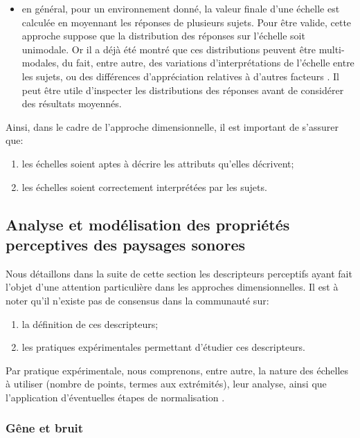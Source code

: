 \begin{itemize}
\item en général, pour un environnement donné, la valeur finale d'une échelle est calculée en moyennant les réponses de plusieurs sujets. Pour être valide, cette approche suppose que la distribution des réponses sur l'échelle soit unimodale. Or il a déjà été montré que ces distributions peuvent être multi-modales, du fait, entre autre, des variations d'interprétations de l'échelle entre les sujets, ou des différences d'appréciation relatives à d'autres facteurs \citep{raimbault2006qualitative}. Il peut être utile d'inspecter les distributions des réponses avant de considérer des résultats moyennés.

\end{itemize}

Ainsi, dans le cadre de l'approche dimensionnelle, il est important de s'assurer que:

\begin{enumerate}
\item les échelles soient aptes à décrire les attributs qu'elles décrivent;
\item les échelles soient correctement interprétées par les sujets.
\end{enumerate}

\subsection{Analyse et modélisation des propriétés perceptives des paysages sonores}
\label{sec:descripteursPercetifs}

Nous détaillons dans la suite de cette section les descripteurs perceptifs ayant fait l'objet d'une attention particulière dans les approches dimensionnelles. Il est à noter qu'il n'existe pas de consensus dans la communauté sur:

\begin{enumerate}
\item la définition de ces descripteurs; 
\item les pratiques expérimentales permettant d'étudier ces descripteurs.
\end{enumerate}

Par pratique expérimentale, nous comprenons, entre autre, la nature des échelles à utiliser (nombre de points, termes aux extrémités), leur analyse, ainsi que l'application d'éventuelles étapes de normalisation \citep{aletta2016soundscape}.

\subsubsection{Gêne et bruit}

